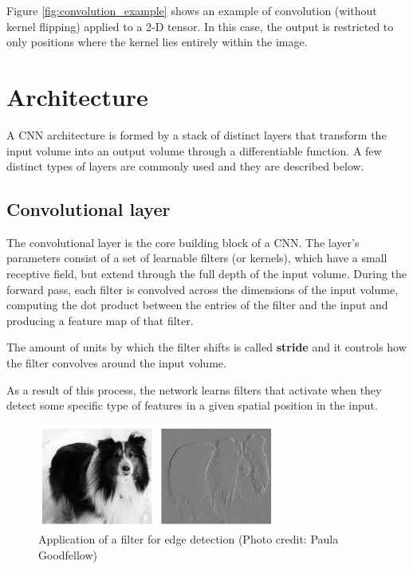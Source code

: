 Figure \ref{fig:convolution_example} shows an example of convolution (without kernel flipping) applied to a 2-D tensor. In this case, the output is restricted to only positions where the kernel lies entirely within the image.

\section{Architecture}

A \acs{CNN} architecture is formed by a stack of distinct layers that transform the input volume into an output volume through a differentiable function. A few distinct types of layers are commonly used and they are described below.

\subsection{Convolutional layer}

The convolutional layer is the core building block of a \acs{CNN}. The layer's parameters consist of a set of learnable filters (or kernels), which have a small receptive field, but extend through the full depth of the input volume. During the forward pass, each filter is convolved across the dimensions of the input volume, computing the dot product between the entries of the filter and the input and producing a feature map of that filter.

The amount of units by which the filter shifts is called \textbf{stride} and it controls how the filter convolves around the input volume.

As a result of this process, the network learns filters that activate when they detect some specific type of features in a given spatial position in the input.

\begin{figure}
	\centering
	\includegraphics[width=0.7\textwidth]{Images/filter_application}
	\caption{Application of a filter for edge detection (Photo credit: Paula
		Goodfellow)}\label{fig:filter_application}
\end{figure}

